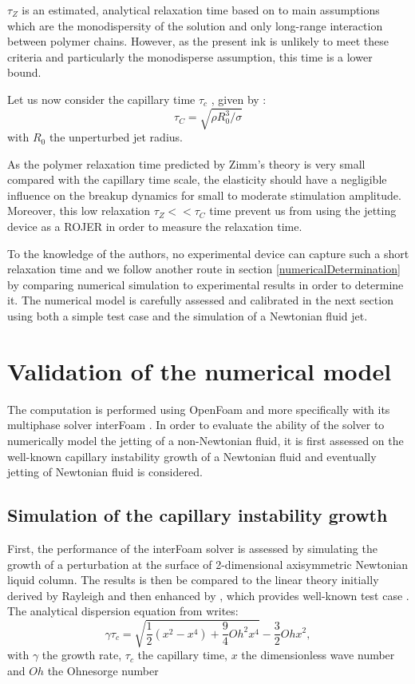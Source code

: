 \documentclass[twocolumn,10pt]{asme2ej}
\begin{document}
$\tau_Z$ is an estimated, analytical relaxation time based on to main assumptions which are the monodispersity of the solution and only long-range interaction between polymer chains. However, as the present ink is unlikely to meet these criteria and particularly the monodisperse assumption, this time is a lower bound.


Let us now consider the capillary time $\tau_c$ , given by :
\begin{equation}
    \tau_C= \sqrt{\rho R_0^3 / \sigma}
\end{equation}
with $R_0$ the unperturbed jet radius. 

As the polymer relaxation time predicted by Zimm's theory is very small compared with the capillary time scale, the elasticity should have a negligible influence on the breakup dynamics for small to moderate stimulation amplitude. Moreover, this low relaxation $\tau_Z<<\tau_C$ time prevent us from using the jetting device as a ROJER \cite{keshavarz2015studying} in order to measure the relaxation time. 

To the knowledge of the authors, no experimental device can capture such a short relaxation time and we follow another route in section \ref{numericalDetermination} by comparing numerical simulation to experimental results in order to determine it. The numerical model is carefully assessed  and calibrated in the next section using both a simple test case and the simulation of a Newtonian fluid jet.

\section{Validation of the numerical model}
The computation is performed using {OpenFoam\textregistered} and more specifically with its multiphase solver interFoam \cite{deshpande2012evaluating}. In order to evaluate the ability of the solver to numerically model the jetting of a non-Newtonian fluid, it is first assessed on the well-known capillary instability growth of a Newtonian fluid and eventually jetting of Newtonian fluid is considered.

\subsection{Simulation of the capillary instability growth}
First, the performance of the interFoam solver is assessed by simulating the growth of a perturbation at the surface of 2-dimensional axisymmetric Newtonian liquid column. The results is then be compared to the linear theory initially derived by Rayleigh \cite{rayleigh1892xvi} and then enhanced by \cite{chandrasekhar2013hydrodynamic}, which provides well-known test case \cite{delteil2011numerical,cervone2010simulation}.
The analytical dispersion equation from \cite{chandrasekhar2013hydrodynamic} writes:
\begin{equation}
    \gamma \tau_c = \sqrt{\frac{1}{2}(x^{2}-x^{4}) + \frac{9}{4}Oh^{2}x^{4}}-\frac{3}{2}Oh x^{2},
    \label{eq:growthRateAnalytical}
\end{equation}
with $\gamma$ the growth rate, $\displaystyle \tau_c $ the capillary time, $x$ the dimensionless wave number and $Oh$ the Ohnesorge number
\end{document}
